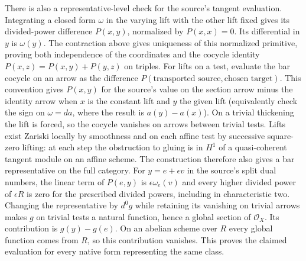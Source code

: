 There is also a representative-level check for the source's tangent
evaluation. Integrating a closed form $\omega$ in the varying lift
with the other lift fixed gives its divided-power difference
$P(x,y)$, normalized by $P(x,x)=0$. Its differential in $y$ is
$\omega(y)$. The contraction above gives uniqueness of this
normalized primitive, proving both independence of the coordinates
and the cocycle identity $P(x,z)=P(x,y)+P(y,z)$ on triples.
For lifts on a test, evaluate the bar cocycle on an arrow as the
difference $P(\text{transported source},\text{chosen target})$. This convention gives $P(x,y)$ for the source's value
on the section arrow minus the identity arrow when $x$ is the
constant lift and $y$ the given lift (equivalently check the sign on
$\omega=da$, where the result is $a(y)-a(x)$).
On a trivial thickening the lift is forced, so the cocycle vanishes
on arrows between trivial tests. Lifts exist Zariski locally by
smoothness and on each affine test by successive square-zero lifting:
at each step the obstruction to gluing is in $H^1$ of a
quasi-coherent tangent module on an affine scheme. The construction
therefore also gives a bar representative on the full category.
For $y=e+\epsilon v$ in the source's split dual numbers, the
linear term of $P(e,y)$ is $\epsilon\omega_e(v)$ and every higher
divided power of $\epsilon R$ is zero for the prescribed divided
powers, including in characteristic two. Changing the representative
by $d^0g$ while retaining its vanishing on trivial arrows makes $g$
on trivial tests a natural function, hence a global section of
$\mathcal O_X$. Its contribution is $g(y)-g(e)$. On an abelian
scheme over $R$ every global function comes from $R$, so this
contribution vanishes. This proves the claimed evaluation for every
native form representing the same class.
